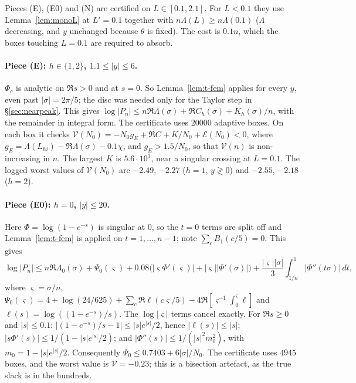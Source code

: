 Pieces (E), (E0) and (N) are certified on $L\in[0.1,2.1]$. For $L<0.1$ they use Lemma~\ref{lem:monoL} at $L'=0.1$ together
with $n\Lambda(L)\ge n\Lambda(0.1)$ ($\Lambda$ decreasing, and $y$ unchanged because $\theta$ is fixed). The cost is $0.1n$,
which the boxes touching $L=0.1$ are required to absorb.

\paragraph{Piece (E): $h\in\{1,2\}$, $1.1\le|y|\le6$.} $\Phi_c$ is analytic on $\Re s>0$ and at $s=0$. So
Lemma~\ref{lem:t-fem} applies for every $y$, even past $|\sigma|=2\pi/5$; the disc was needed only for the Taylor step in
\S\ref{sec:nearpeak}. This gives $\log|P_n|\le n\Re \Lambda(\sigma)+\Re C_h(\sigma)+K_h(\sigma)/n$, with the remainder in
integral form. The certificate uses $20000$ adaptive boxes. On each box it checks
$\mathcal V(N_0)=-N_0g_E+\Re C+K/N_0+\mathcal E(N_0)<0$, where $g_E=\Lambda(L_{hi})-\Re \Lambda(\sigma)-0.1\chi$, and
$g_E>1.5/N_0$, so that $\mathcal V(n)$ is non-increasing in $n$. The largest $K$ is $5.6\cdot10^3$, near a singular
crossing at $L=0.1$. The logged worst values of $\mathcal V(N_0)$ are $-2.49$, $-2.27$ ($h=1$, $y\gtrless0$) and
$-2.55$, $-2.18$ ($h=2$).

\paragraph{Piece (E0): $h=0$, $|y|\le20$.} Here $\Phi=\log(1-e^{-s})$ is singular at $0$, so the $t=0$ terms are split
off and Lemma~\ref{lem:t-fem} is applied on $t=1,\dots,n-1$; note $\sum_cB_1(c/5)=0$. This gives
\[
\log|P_n|\le n\Re \Lambda_0(\sigma)+\Psi_0(\varsigma)+0.08\big(|\varsigma\Phi'(\varsigma)|+|\varsigma||\Phi'(\sigma)|\big)
+\frac{|\varsigma||\sigma|}3\int_{1/n}^1|\Phi''(t\sigma)|\,dt,
\]
where $\varsigma=\sigma/n$,
$\Psi_0(\varsigma)=4+\log(24/625)+\sum_c\Re\ell(c\varsigma/5)-4\Re[\varsigma^{-1}\int_0^\varsigma\ell]$ and
$\ell(s)=\log((1-e^{-s})/s)$. The $\log|\varsigma|$ terms cancel exactly. For $\Re s\ge0$ and $|s|\le0.1$:
$|(1-e^{-s})/s-1|\le|s|e^{|s|}/2$, hence $|\ell(s)|\le|s|$; $|s\Phi'(s)|\le1/(1-|s|e^{|s|}/2)$; and
$|\Phi''(s)|\le1/(|s|^2m_0^2)$, with $m_0=1-|s|e^{|s|}/2$. Consequently $\Psi_0\le0.7403+6|\sigma|/N_0$. The certificate uses
$4945$ boxes, and the worst value is $\mathcal V=-0.23$; this is a bisection artefact, as the true slack is in the hundreds.

